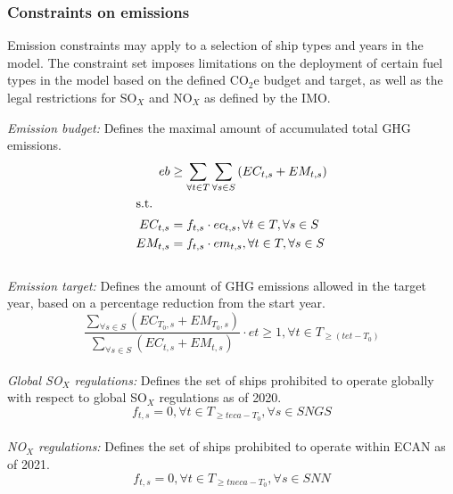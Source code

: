 \documentclass[article]{elsarticle}
\begin{document}
\subsubsection{Constraints on emissions}
\label{subsubsec:emconstraints}
Emission constraints may apply to a selection of ship types and years in the model. The constraint set imposes limitations on the deployment of certain fuel types in the model based on the defined CO$_2$e budget and target, as well as the legal restrictions for SO$_X$ and NO$_X$ as defined by the IMO.
\\\par\noindent
\textit{Emission budget: }Defines the maximal amount of accumulated total GHG emissions.
\begin{subequations}
    \begin{align}
    eb &\geq \sum_{\forall t \in T}\sum_{\forall s \in S}\left(EC_{t,s} + EM_{t,s} \right) \label{eq:co2ebudget}\\
    \intertext{s.t.}
    EC_{t,s} &= f_{t,s} \cdot ec_{t,s}, \forall t \in T, \forall s \in S\\
    EM_{t,s} &= f_{t,s} \cdot em_{t,s}, \forall t \in T, \forall s \in S
    \end{align}
\end{subequations}\\
\textit{Emission target: }Defines the amount of GHG emissions allowed in the target year, based on a percentage reduction from the start year.
\begin{equation}
    \frac{\sum_{\forall s \in S} \left(EC_{T_0,s}+EM_{T_0,s}\right)}{\sum_{\forall s \in S} \left(EC_{t,s}+EM_{t,s}\right)} \cdot et \geq 1, \forall t \in T_{\geq \left(tet-T_0\right)}
\end{equation}\\
\textit{Global SO$_X$ regulations: }Defines the set of ships prohibited to operate globally with respect to global SO$_X$ regulations as of 2020.
\begin{equation}
    f_{t,s} = 0, \forall t \in T_{\geq teca-T_0}, \forall s \in SNGS \label{eq:sox_global}
\end{equation}\\
\textit{NO$_X$ regulations: }Defines the set of ships prohibited to operate within ECAN as of 2021.
\begin{equation}
   f_{t,s} = 0, \forall t \in T_{\geq tneca-T_0},\forall s \in SNN \label{eq:tier}
\end{equation}

\newpage
\end{document}
